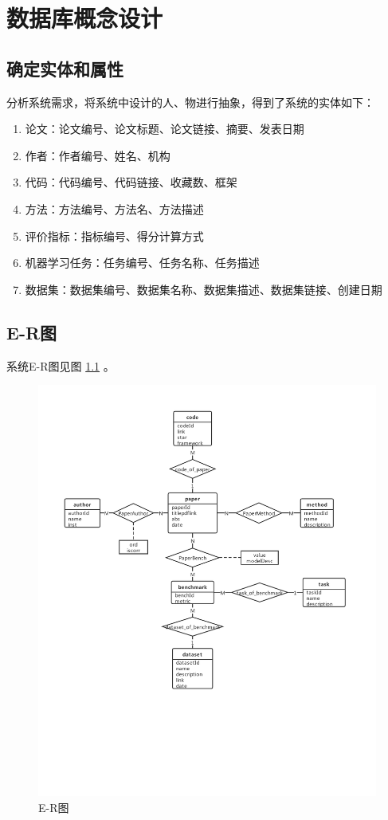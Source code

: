 \chapter{数据库概念设计}

\section{确定实体和属性}
分析系统需求，将系统中设计的人、物进行抽象，得到了系统的实体如下：

\begin{enumerate}
    \item 论文：论文编号、论文标题、论文链接、摘要、发表日期
    \item 作者：作者编号、姓名、机构
    \item 代码：代码编号、代码链接、收藏数、框架
    \item 方法：方法编号、方法名、方法描述
    \item 评价指标：指标编号、得分计算方式
    \item 机器学习任务：任务编号、任务名称、任务描述
    \item 数据集：数据集编号、数据集名称、数据集描述、数据集链接、创建日期
\end{enumerate}

\section{E-R图}
系统E-R图见图 \ref{fig:er} 。

\begin{figure}[htbp!]
    \centering
    \includegraphics[width=\textwidth]{figures/Papers with Code.pdf}
    \caption{E-R图}
    \label{fig:er}
\end{figure}

